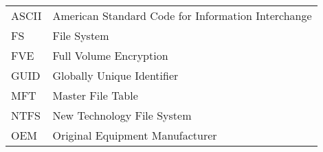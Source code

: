 
\seznamzkr

\begin{tabular}{ll}
  ASCII & American Standard Code for Information Interchange \\
  FS &  File System \\
  FVE & Full Volume Encryption \\
  GUID & Globally Unique Identifier \\
  MFT & Master File Table \\
  NTFS & New Technology File System \\
  OEM & Original Equipment Manufacturer \\
\end{tabular}


